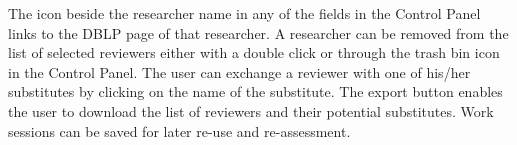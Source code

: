 The icon beside the researcher name in any of the fields in the Control Panel links to the DBLP page of that researcher. 
A researcher can be removed from the list of selected reviewers either with a double click or through the trash bin icon in the Control Panel. The user can exchange a reviewer with one of his/her substitutes by clicking on the name of the substitute.
The export button enables the user to download the list of reviewers and their potential substitutes. Work sessions can be saved for later re-use and re-assessment. 